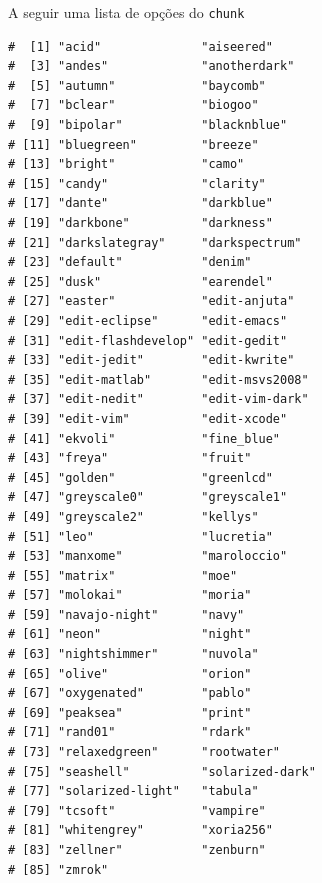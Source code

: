 \documentclass[10pt,ignorenonframetext,]{beamer}
\newenvironment{Shaded}{\begin{snugshade}}{\end{snugshade}}
\newcommand{\DataTypeTok}[1]{\textcolor[rgb]{0.74,0.68,0.62}{\underline{#1}}}
\newcommand{\DecValTok}[1]{\textcolor[rgb]{0.27,0.67,0.26}{#1}}
\newcommand{\KeywordTok}[1]{\textcolor[rgb]{0.26,0.66,0.93}{\textbf{#1}}}
\newcommand{\NormalTok}[1]{\textcolor[rgb]{0.74,0.68,0.62}{#1}}
\newcommand{\OperatorTok}[1]{\textcolor[rgb]{0.74,0.68,0.62}{#1}}
\begin{document}
\begin{frame}[fragile]{A seguir uma lista de opções do \texttt{chunk}}
\protect\hypertarget{a-seguir-uma-lista-de-opuxe7uxf5es-do-chunk-1}{}

\begin{Shaded}
\end{Shaded}

\begin{verbatim}
#  [1] "acid"              "aiseered"         
#  [3] "andes"             "anotherdark"      
#  [5] "autumn"            "baycomb"          
#  [7] "bclear"            "biogoo"           
#  [9] "bipolar"           "blacknblue"       
# [11] "bluegreen"         "breeze"           
# [13] "bright"            "camo"             
# [15] "candy"             "clarity"          
# [17] "dante"             "darkblue"         
# [19] "darkbone"          "darkness"         
# [21] "darkslategray"     "darkspectrum"     
# [23] "default"           "denim"            
# [25] "dusk"              "earendel"         
# [27] "easter"            "edit-anjuta"      
# [29] "edit-eclipse"      "edit-emacs"       
# [31] "edit-flashdevelop" "edit-gedit"       
# [33] "edit-jedit"        "edit-kwrite"      
# [35] "edit-matlab"       "edit-msvs2008"    
# [37] "edit-nedit"        "edit-vim-dark"    
# [39] "edit-vim"          "edit-xcode"       
# [41] "ekvoli"            "fine_blue"        
# [43] "freya"             "fruit"            
# [45] "golden"            "greenlcd"         
# [47] "greyscale0"        "greyscale1"       
# [49] "greyscale2"        "kellys"           
# [51] "leo"               "lucretia"         
# [53] "manxome"           "maroloccio"       
# [55] "matrix"            "moe"              
# [57] "molokai"           "moria"            
# [59] "navajo-night"      "navy"             
# [61] "neon"              "night"            
# [63] "nightshimmer"      "nuvola"           
# [65] "olive"             "orion"            
# [67] "oxygenated"        "pablo"            
# [69] "peaksea"           "print"            
# [71] "rand01"            "rdark"            
# [73] "relaxedgreen"      "rootwater"        
# [75] "seashell"          "solarized-dark"   
# [77] "solarized-light"   "tabula"           
# [79] "tcsoft"            "vampire"          
# [81] "whitengrey"        "xoria256"         
# [83] "zellner"           "zenburn"          
# [85] "zmrok"
\end{verbatim}

\end{frame}
\end{document}
